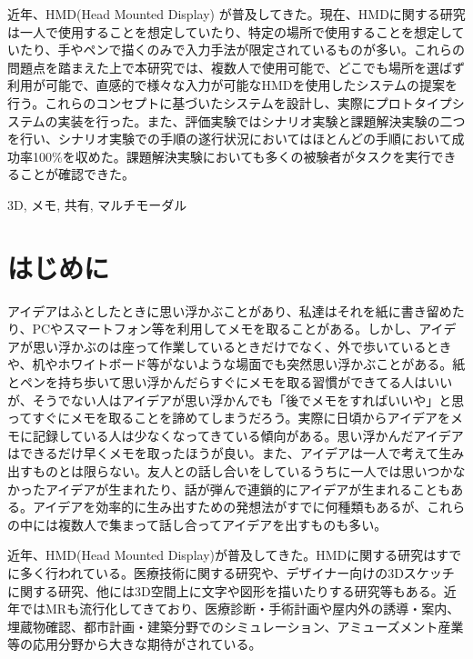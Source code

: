 \documentclass[technicalreport]{ieicej}
\begin{document}
\begin{jabstract}
近年、HMD(Head Mounted Display) が普及してきた。現在、HMDに関する研究は一人で使用することを想定していたり、特定の場所で使用することを想定していたり、手やペンで描くのみで入力手法が限定されているものが多い。これらの問題点を踏まえた上で本研究では、複数人で使用可能で、どこでも場所を選ばず利用が可能で、直感的で様々な入力が可能なHMDを使用したシステムの提案を行う。これらのコンセプトに基づいたシステムを設計し、実際にプロトタイプシステムの実装を行った。また、評価実験ではシナリオ実験と課題解決実験の二つを行い、シナリオ実験での手順の遂行状況においてはほとんどの手順において成功率100\%を収めた。課題解決実験においても多くの被験者がタスクを実行できることが確認できた。
\end{jabstract}
\begin{jkeyword}
3D, メモ, 共有, マルチモーダル
\end{jkeyword}
\maketitle

\section{はじめに}
アイデアはふとしたときに思い浮かぶことがあり、私達はそれを紙に書き留めたり、PCやスマートフォン等を利用してメモを取ることがある。しかし、アイデアが思い浮かぶのは座って作業しているときだけでなく、外で歩いているときや、机やホワイトボード等がないような場面でも突然思い浮かぶことがある。紙とペンを持ち歩いて思い浮かんだらすぐにメモを取る習慣ができてる人はいいが、そうでない人はアイデアが思い浮かんでも「後でメモをすればいいや」と思ってすぐにメモを取ることを諦めてしまうだろう。実際に日頃からアイデアをメモに記録している人は少なくなってきている傾向がある\cite{memo}。思い浮かんだアイデアはできるだけ早くメモを取ったほうが良い。また、アイデアは一人で考えて生み出すものとは限らない。友人との話し合いをしているうちに一人では思いつかなかったアイデアが生まれたり、話が弾んで連鎖的にアイデアが生まれることもある。アイデアを効率的に生み出すための発想法がすでに何種類もあるが、これらの中には複数人で集まって話し合ってアイデアを出すものも多い\cite{hassouhou}。

近年、HMD(Head Mounted Display)が普及してきた。HMDに関する研究はすでに多く行われている。医療技術に関する研究や、デザイナー向けの3Dスケッチに関する研究、他には3D空間上に文字や図形を描いたりする研究等もある。近年ではMRも流行化してきており、医療診断・手術計画や屋内外の誘導・案内、埋蔵物確認、都市計画・建築分野でのシミュレーション、アミューズメント産業等の応用分野から大きな期待がされている\cite{mr}。
\end{document}
